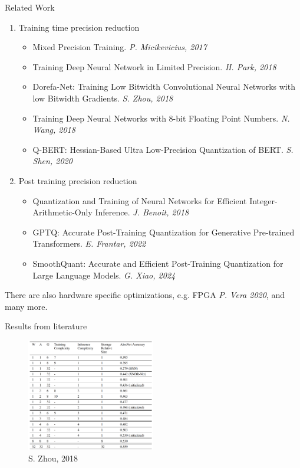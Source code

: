 \documentclass[aspectratio=169]{beamer} %
\begin{document}
\begin{frame}{Related Work}
  \begin{enumerate}
    \item Training time precision reduction\begin{itemize}
      \item Mixed Precision Training. \emph{P. Micikevicius, 2017}
      \item Training Deep Neural Network in Limited Precision. \emph{H. Park, 2018}
      \item Dorefa-Net: Training Low Bitwidth Convolutional Neural Networks with low Bitwidth Gradients. \emph{S. Zhou, 2018}
      \item Training Deep Neural Networks with 8-bit Floating Point Numbers. \emph{N. Wang, 2018}
      \item Q-BERT: Hessian-Based Ultra Low-Precision Quantization of BERT. \emph{S. Shen, 2020}


    \end{itemize}
    \item Post training precision reduction\begin{itemize}
      \item Quantization and Training of Neural Networks for Efficient Integer-Arithmetic-Only Inference. \emph{J. Benoit, 2018}
      \item GPTQ: Accurate Post-Training Quantization for Generative Pre-trained Transformers. \emph{E. Frantar, 2022}
      \item SmoothQuant: Accurate and Efficient Post-Training Quantization for Large Language Models. \emph{G. Xiao, 2024}
    \end{itemize}
  \end{enumerate}

  There are also hardware specific optimizations, e.g. FPGA \emph{P. Vera 2020}, and many more.
\end{frame}

\begin{frame}{Results from literature}
  \begin{figure}
    \includegraphics[width=0.5\textwidth]{figures/results-table.png}
    \caption{S. Zhou, 2018}
  \end{figure}
\end{frame}
\end{document}
